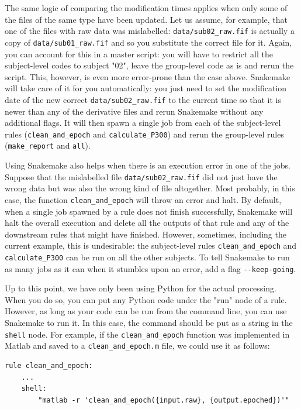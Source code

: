 \documentclass[a4paper,man,floatsintext,natbib]{apa6}
\begin{document}
The same logic of comparing the modification times applies when only some of the files of the same type have been updated. Let us assume, for example, that one of the files with raw data was mislabelled: \verb|data/sub02_raw.fif| is actually a copy of \verb|data/sub01_raw.fif| and so you substitute the correct file for it. Again, you can account for this in a master script: you will have to restrict all the subject-level codes to subject "02", leave the group-level code as is and rerun the script. This, however, is even more error-prone than the case above. Snakemake will take care of it for you automatically: you just need to set the modification date of the new correct \verb|data/sub02_raw.fif| to the current time so that it is newer than any of the derivative files and rerun Snakemake without any additional flags. It will then spawn a single job from each of the subject-level rules (\verb|clean_and_epoch| and \verb|calculate_P300|) and rerun the group-level rules (\verb|make_report| and \verb|all|).

Using Snakemake also helps when there is an execution error in one of the jobs.
Suppose that the mislabelled file \verb|data/sub02_raw.fif| did not just have the wrong data but was also the wrong kind of file altogether. Most probably, in this case, the function \verb|clean_and_epoch| will throw an error and halt. By default, when a single job spawned by a rule does not finish successfully, Snakemake will halt the overall execution and delete all the outputs of that rule and any of the downstream rules that might have finished. However, sometimes, including the current example, this is undesirable: the subject-level rules \verb|clean_and_epoch| and \verb|calculate_P300| can be run on all the other subjects. To tell Snakemake to run as many jobs as it can when it stumbles upon an error, add a flag \verb|--keep-going|.

Up to this point, we have only been using Python for the actual processing. When you do so, you can put any Python code under the "run" node of a rule. However, as long as your code can be run from the command line, you can use Snakemake to run it. In this case, the command should be put as a string in the \verb|shell| node. For example, if the \verb|clean_and_epoch| function was implemented in Matlab and saved to a \verb|clean_and_epoch.m| file, we could use it as follows:

\begin{verbatim}
rule clean_and_epoch:
    ...
    shell:
        "matlab -r 'clean_and_epoch({input.raw}, {output.epoched})'"
\end{verbatim}
\end{document}
